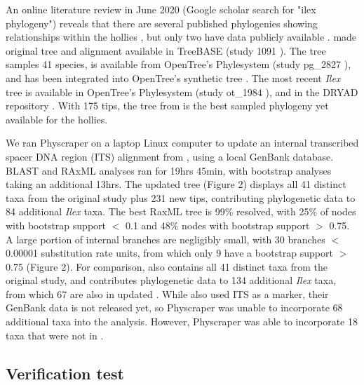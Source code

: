 \documentclass{bmcart}
\begin{document}
An online literature review in June 2020 (Google scholar search for "ilex phylogeny")
reveals that there are several published phylogenies showing relationships within
the hollies \cite{cuenoud2000molecular, manen2010history, setoguchi2000intersectional,
selbach2009new}, but only two have data publicly available \cite{gottlieb2005molecular, yao2020phylogeny}.
\cite{gottlieb2005molecular} made original tree and alignment available in TreeBASE
(study 1091 \cite{treebase1091}). The tree samples 41 species, is available from
OpenTree's Phylesystem (study pg\_2827 \cite{pg2827}),
and has been integrated into OpenTree's synthetic tree \cite{mrcaott68451ott89474}.
The most recent \textit{Ilex} tree \cite{yao2020phylogeny} is available in
OpenTree's Phylesystem (study ot\_1984 \cite{ot1984}),
and in the DRYAD repository \cite{yao2020dryad}.
With 175 tips, the tree from \cite{yao2020phylogeny} is the best sampled phylogeny yet available for
the hollies.

We ran Physcraper on a laptop Linux computer to update an internal transcribed
spacer DNA region (ITS) alignment from \cite{gottlieb2005molecular}, using a local
GenBank database.  BLAST and RAxML analyses ran for 19hrs 45min, with bootstrap
analyses taking an additional 13hrs.
The updated \cite{gottlieb2005molecular} tree (Figure 2) displays
all 41 distinct
taxa from the original study plus 231 new tips, contributing phylogenetic data to
84 additional \textit{Ilex} taxa. The best RaxML tree is 99\% resolved, with 25\% of nodes
with bootstrap support $<$ 0.1 and 48\% nodes with bootstrap support $>$ 0.75.
A large portion of internal branches are negligibly small, with 30 branches
$<$ 0.00001 substitution rate units, from which only 9 have a bootstrap support $>$ 0.75
(Figure 2).
For comparison, \cite{yao2020phylogeny} also contains all 41 distinct taxa from
the original
\cite{gottlieb2005molecular} study,
and contributes phylogenetic data to 134 additional \textit{Ilex} taxa, from which
67 are also in updated \cite{gottlieb2005molecular}. While \cite{yao2020phylogeny} also used
ITS as a marker, their GenBank data is not released yet, so Physcraper was unable
to incorporate 68 additional taxa into the analysis. However, Physcraper was able
to incorporate 18 taxa that were not in \cite{yao2020phylogeny}.

\subsection*{Verification test}
\end{document}
